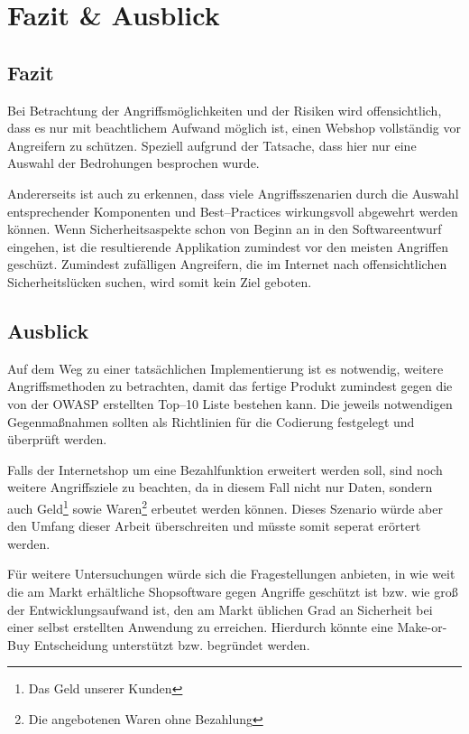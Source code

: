 \section{Fazit \& Ausblick}

\subsection{Fazit}

Bei Betrachtung der Angriffsmöglichkeiten und der Risiken wird offensichtlich, dass es nur mit beachtlichem Aufwand möglich ist, einen Webshop vollständig vor Angreifern zu schützen. Speziell aufgrund der Tatsache, dass hier nur eine Auswahl der Bedrohungen besprochen wurde.

Andererseits ist auch zu erkennen, dass viele Angriffsszenarien durch die Auswahl entsprechender Komponenten und Best--Practices wirkungsvoll abgewehrt werden können. Wenn Sicherheitsaspekte schon von Beginn an in den Softwareentwurf eingehen, ist die resultierende Applikation zumindest vor den meisten Angriffen geschüzt. Zumindest zufälligen Angreifern, die im Internet nach offensichtlichen Sicherheitslücken suchen, wird somit kein Ziel geboten.

\subsection{Ausblick}

Auf dem Weg zu einer tatsächlichen Implementierung ist es notwendig, weitere Angriffsmethoden zu betrachten, damit das fertige Produkt zumindest gegen die von der OWASP erstellten Top--10 Liste bestehen kann. Die jeweils notwendigen Gegenmaßnahmen sollten als Richtlinien für die Codierung festgelegt und überprüft werden. 

Falls der Internetshop um eine Bezahlfunktion erweitert werden soll, sind noch weitere Angriffsziele zu beachten, da in diesem Fall nicht nur Daten, sondern auch Geld\footnote{Das Geld unserer Kunden} sowie Waren\footnote{Die angebotenen Waren ohne Bezahlung} erbeutet werden können. Dieses Szenario würde aber den Umfang dieser Arbeit überschreiten und müsste somit seperat erörtert werden.

Für weitere Untersuchungen würde sich die Fragestellungen anbieten, in wie weit die am Markt erhältliche Shopsoftware gegen Angriffe geschützt ist bzw. wie groß der Entwicklungsaufwand ist, den am Markt üblichen Grad an Sicherheit bei einer selbst erstellten Anwendung zu erreichen. Hierdurch könnte eine Make-or-Buy Entscheidung unterstützt bzw. begründet werden.